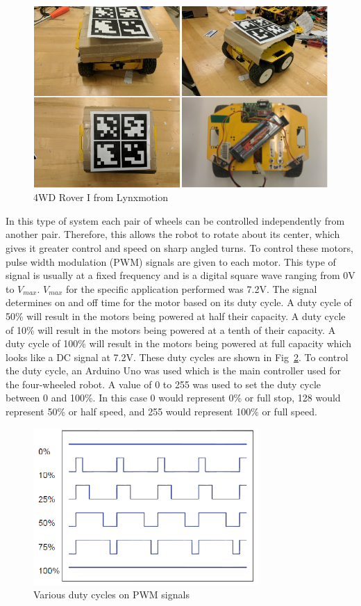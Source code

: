 \documentclass[12pt,american]{report}
\begin{document}
\begin{figure}[h!]
\centering
\includegraphics[scale=.5]{images/robot.PNG}
\caption{4WD Rover I from Lynxmotion}
\label{fig:robot}
\end{figure}

In this type of system each pair of wheels can be controlled independently from another pair.
Therefore, this allows the robot to rotate about its center, which gives it greater control and speed on
sharp angled turns. To control these motors, pulse width modulation (PWM) signals are given to each motor. This type of signal is usually at a fixed frequency and is a digital square wave ranging from 0V to \textit{$V_{max}$}. \textit{$V_{max}$} for the specific application performed was 7.2V. The signal determines on and off time for the motor based on its duty cycle. A duty cycle of 50\% will result in the motors being powered at half their capacity. A duty cycle of 10\% will result in the motors being powered at a tenth of their capacity. A duty cycle of 100\% will result in the motors being powered at full capacity
which looks like a DC signal at 7.2V. These duty cycles are shown in Fig~\ref{fig:pwm}. To control the duty cycle, an Arduino Uno was used which is the main controller used for the four-wheeled robot. A value of 0 to 255 was
used to set the duty cycle between 0 and 100\%. In this case 0 would represent 0\% or full stop, 128 would represent 50\% or half speed, and 255
would represent 100\% or full speed.
\begin{figure}[h!]
\centering
\includegraphics[scale=1]{images/PWM.PNG}
\caption{Various duty cycles on PWM signals}
\label{fig:pwm}
\end{figure}
\end{document}
